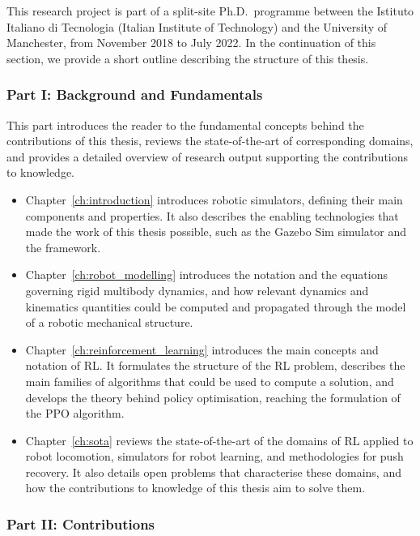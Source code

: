 \vspace{3mm}
This research project is part of a split-site Ph.D.\ programme between the Istituto Italiano di Tecnologia (Italian Institute of Technology) and the University of Manchester, from November 2018 to July 2022.
In the continuation of this section, we provide a short outline describing the structure of this thesis.

\subsubsection{Part I: Background and Fundamentals}

This part introduces the reader to the fundamental concepts behind the contributions of this thesis, reviews the state-of-the-art of corresponding domains, and provides a detailed overview of research output supporting the contributions to knowledge.

\begin{itemize}
    \item Chapter~\ref{ch:introduction} introduces robotic simulators, defining their main components and properties. It also describes the enabling technologies that made the work of this thesis possible, such as the Gazebo Sim simulator and the \jax framework.
    \item Chapter~\ref{ch:robot_modelling} introduces the notation and the equations governing rigid multibody dynamics, and how relevant dynamics and kinematics quantities could be computed and propagated through the model of a robotic mechanical structure.
    \item Chapter~\ref{ch:reinforcement_learning} introduces the main concepts and notation of \ac{RL}. It formulates the structure of the \ac{RL} problem, describes the main families of algorithms that could be used to compute a solution, and develops the theory behind policy optimisation, reaching the formulation of the \acl{PPO} algorithm.
    \item Chapter~\ref{ch:sota} reviews the state-of-the-art of the domains of \acl{RL} applied to robot locomotion, simulators for robot learning, and methodologies for push recovery. It also details open problems that characterise these domains, and how the contributions to knowledge of this thesis aim to solve them.
\end{itemize}

\subsubsection{Part II: Contributions}

